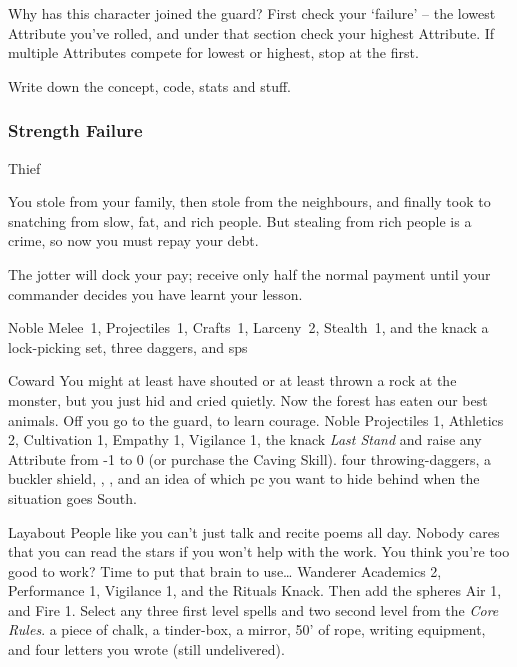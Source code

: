 \begin{multicols}{2}

\noindent
Why has this character joined the \gls{guard}?
First check your `failure' -- the lowest Attribute you've rolled, and under that section check your highest Attribute.
If multiple Attributes compete for lowest or highest, stop at the first.

Write down the concept, code, stats and stuff.

\subsubsection{Strength Failure}

\begin{itemize}

    {Thief}%
    {
      You stole from your family, then stole from the neighbours, and finally took to snatching from slow, fat, and rich people.
      But stealing from rich people is a crime, so now you must repay your debt.

      The \gls{jotter} will dock your pay; receive only half the normal payment until your commander decides you have learnt your lesson.

    }%
    {Noble}%
    {Melee~1, Projectiles~1, Crafts~1, Larceny~2, Stealth~1, and the knack }%
    {a lock-picking set, three daggers, and  \glspl{sp}}%

    {Coward}%
    {
      You might at least have shouted or at least thrown a rock at the \gls{monster}, but you just hid and cried quietly.
      Now the forest has eaten our best animals.
      Off you go to the \gls{guard}, to learn courage.
    }%
    {Noble}%
    {
      Projectiles 1, Athletics 2, Cultivation 1, Empathy 1, Vigilance 1, the knack \textit{Last Stand} and raise any Attribute from -1 to 0 (or purchase the Caving Skill).
    }%
    {
      four throwing-daggers, a buckler shield, \rations, \rations, and an idea of which \gls{pc} you want to hide behind when the situation goes South.
    }%


    {Layabout}%
    {
      People like you can't just talk and recite poems all day.
      Nobody cares that you can read the stars if you won't help with the work.
      You think you're too good to work?
      Time to put that brain to use\ldots
    }%
    {Wanderer}%
    {%
      Academics 2, Performance 1, Vigilance 1, and the Rituals Knack.
    Then add the \glspl{sphere} Air 1, and Fire 1.
    Select any three first level spells and two second level from the \textit{Core Rules}\iftoggle{core}{, pages \pageref{fireSpells} and \pageref{lightSpells}}{}.
    }%
    {
      a piece of chalk, a tinder-box, a mirror, 50' of rope, writing equipment, and four letters you wrote (still undelivered).
    }%


\end{itemize}
\end{multicols}
